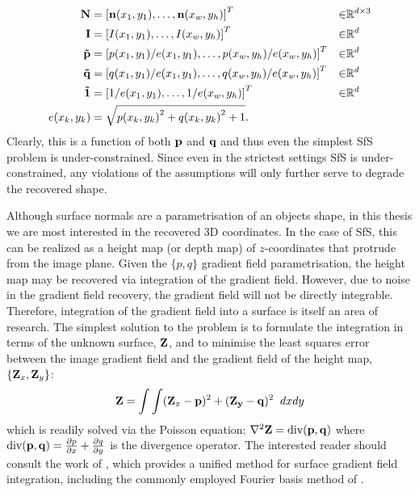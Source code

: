 \begin{align*}
    \boldsymbol{\mathbf{N}} &= {[\boldsymbol{\mathbf{n}}(x_1, y_1), \ldots, \boldsymbol{\mathbf{n}}(x_w, y_h)]}^T &\in &\mathbb{R}^{d \times 3} \\
	\boldsymbol{\mathbf{I}} &= {[I(x_1, y_1), \ldots, I(x_w, y_h)]}^T &\in &\mathbb{R}^{d} \\
	\boldsymbol{\mathbf{\tilde{p}}} &= {[p(x_1, y_1) / e(x_1, y_1), \ldots, p(x_w, y_h) / e(x_w, y_h)]}^T &\in &\mathbb{R}^{d} \\
	\boldsymbol{\mathbf{\tilde{q}}} &= {[q(x_1, y_1) / e(x_1, y_1), \ldots, q(x_w, y_h) / e(x_w, y_h)]}^T &\in &\mathbb{R}^{d} \\
 	\boldsymbol{\mathbf{\tilde{1}}} &= {[1 / e(x_1, y_1), \ldots, 1 / e(x_w, y_h)]}^T &\in &\mathbb{R}^{d} \\
	e(x_k, y_k) &= \sqrt{{p(x_k, y_k)}^2 + {q(x_k, y_k)}^2 + 1}. & &
\end{align*}
Clearly, this is a function of both $\boldsymbol{\mathbf{p}}$ and $\boldsymbol{\mathbf{q}}$ and thus even
the simplest SfS problem is under-constrained. Since
even in the strictest settings SfS is under-constrained, any violations
of the assumptions will only further serve to degrade the recovered shape.

Although surface normals
are a parametrisation of an objects shape, in this thesis we are most
interested in the recovered 3D coordinates. In the case of SfS, this can be
realized as a height map (or depth map) of $z$-coordinates that protrude
from the image plane. Given the $\{p, q\}$ gradient field parametrisation, the
height map may be recovered via integration of the gradient field. However,
due to noise in the gradient field recovery, the gradient field will not be
directly integrable. Therefore, integration of the gradient field into a
surface is itself an area of research. The simplest solution to the
problem is to formulate the integration in terms of the unknown surface,
$\boldsymbol{\mathbf{Z}}$, and to minimise the least squares error~\cite{horn1990height,simchony1990direct,agrawal2006range}
between the image gradient field and the gradient field of the height map,
$\{\boldsymbol{\mathbf{Z}}_x, \boldsymbol{\mathbf{Z}}_y\}$:
\begin{equation}\label{eq:bg_sfs_gradient_field_ls}
    \boldsymbol{\mathbf{Z}} = \int \int (\boldsymbol{\mathbf{Z}}_x - \boldsymbol{\mathbf{p}})^2 + (\boldsymbol{\mathbf{Z_y}} - \boldsymbol{\mathbf{q}})^2 \;\; dx dy
\end{equation}
which is readily solved via the Poisson equation:
$\nabla^2 \boldsymbol{\mathbf{Z}} = \operatorname{div}(\boldsymbol{\mathbf{p}}, \boldsymbol{\mathbf{q}})$ where
$\operatorname{div}(\boldsymbol{\mathbf{p}}, \boldsymbol{\mathbf{q}}) = \frac{\partial p}{\partial x} + \frac{\partial q}{\partial y}$
is the divergence operator. The interested reader should consult the
work of \citet{agrawal2006range}, which provides a unified method for
surface gradient field integration, including the commonly employed Fourier
basis method of \citet{frankot1988method}.

